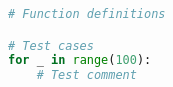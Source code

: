 \documentclass[11pt]{article}
\begin{document}
\begin{lstlisting}[language=Python]
# Function definitions

# Test cases
for _ in range(100):
    # Test comment
\end{lstlisting}
\end{document}
